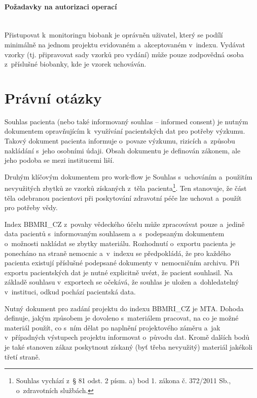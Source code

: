 \documentclass[11pt, draft, oneside]{fithesis2}
\newcommand{\paragraphNewLine}[1]{\paragraph*{#1}\mbox{}\\}
\newcommand{\ProjectName}{\mbox{BBMRI\_CZ}\xspace}
\begin{document}
\paragraphNewLine{Požadavky na autorizaci operací}
Přistupovat k~monitoringu biobank je oprávněn uživatel, který se podílí minimálně na jednom projektu evidovaném a~akceptovaném v~indexu.
Vydávat vzorky (tj. připravovat sady vzorků pro vydání) může pouze zodpovědná osoba z~příslušné biobanky, kde je vzorek uchováván.

\section{Právní otázky}\label{chapter:analysis:section:legal}
Souhlas pacienta (nebo také informovaný souhlas -- informed consent) je nutným dokumentem opravňujícím k~využívání pacientských dat pro potřeby výzkumu. Takový dokument pacienta informuje o~povaze výzkumu, rizicích a~způsobu nakládání s~jeho osobními údaji. Obsah dokumentu je definován zákonem, ale jeho podoba se mezi institucemi liší. 

Druhým klíčovým dokumentem pro work-flow je Souhlas s~uchováním a~použitím nevyužitých zbytků ze vzorků získaných z~těla pacienta\footnote{Souhlas vychází z~§ 81 odst. 2 písm. a) bod 1. zákona č. 372/2011 Sb., o~zdravotních službách.}. Ten stanovuje, že část těla odebranou pacientovi při poskytování zdravotní péče lze uchovat a~použít pro potřeby vědy. 

Index \ProjectName z~povahy vědeckého účelu může zpracovávat pouze a~jedině data pacientů s~informovaným souhlasem a~s~podepsaným dokumentem o~možnosti nakládat se zbytky materiálu. Rozhodnutí o~exportu pacienta je ponecháno na straně nemocnic a~v~indexu se předpokládá, že pro každého pacienta existují příslušné podepsané dokumenty v~nemocničním archivu.
Při exportu pacientských dat je nutné explicitně uvézt, že pacient souhlasil. Na základě souhlasu v~exportech se očekává, že souhlas je uložen a~dohledatelný  v~instituci, odkud pochází pacientská data.

Nutný dokument pro zadání projektu do indexu \ProjectName je MTA. Dohoda definuje, jakým způsobem je dovoleno s~materiálem pracovat, na co je možné materiál použít, co s~ním dělat po naplnění projektového záměru a~jak v~případných výstupech projektu informovat o~původu dat. Kromě dalších bodů je také stanoven zákaz poskytnout získaný (byť třeba nevyužitý) materiál jakékoli třetí straně.


\end{document}
